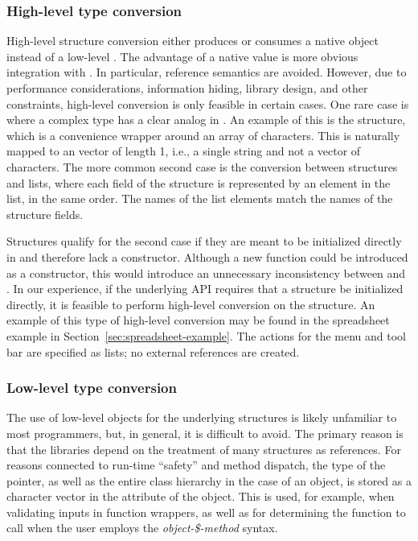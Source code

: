 \documentclass[article,shortnames]{jss}
\begin{document}
\subsubsection{High-level type
conversion}

High-level structure conversion either produces or consumes a native
 object instead of a low-level . The
advantage of a native  value is more obvious integration
with
. In particular, reference semantics are avoided.
However, due to performance considerations, information hiding,
library design, and other constraints, high-level conversion is only
feasible in certain cases.  One rare case is where a complex
 type has a clear analog in .  An example of
this is the  structure, which is a convenience wrapper
around an array of characters. This is naturally mapped to an
  vector of length 1, i.e., a single string
and
not a vector of characters. The more common second case is
the conversion between  structures and  lists,
where each field of the structure is represented by an element in the
list, in the same order. The names of the list elements match the
names of the structure fields.

Structures qualify for the second case if they are meant to be
initialized directly in  and therefore lack a constructor.
Although a new function could be introduced as a constructor, this
would introduce an unnecessary inconsistency between  and
.
In our experience, if the underlying API requires that a structure be
initialized directly, it is feasible to perform high-level conversion
on the structure. An example of this type of high-level conversion may
be found in the spreadsheet example in Section~\ref{sec:spreadsheet-example}. The actions for the menu and tool bar
are specified as lists; no external references are created.

\subsubsection{Low-level type conversion}

The use of low-level  objects for the underlying
 structures is likely unfamiliar to most 
programmers, but, in general, it is difficult to avoid. The primary
reason is that the  libraries depend on the treatment of
many structures as references. For reasons connected to run-time
``safety'' and method dispatch, the type of the pointer, as well as
the entire class hierarchy in the case of an object, is stored as a
character vector in the  attribute of the 
object. 
This is used, for example, when validating inputs in
function wrappers, as well as for determining the function to call
when the user employs the \emph{object-\$-method} syntax.
\end{document}
